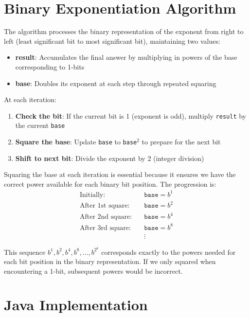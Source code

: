 \documentclass{article}
\begin{document}
	\section{Binary Exponentiation Algorithm}
	The algorithm processes the binary representation of the exponent from right to left (least significant bit to most significant bit), maintaining two values:
	\begin{itemize}[itemsep=2pt]
		\item \textbf{result}: Accumulates the final answer by multiplying in powers of the base corresponding to 1-bits
		\item \textbf{base}: Doubles its exponent at each step through repeated squaring
	\end{itemize}
	
	At each iteration:
	\begin{enumerate}[itemsep=2pt]
		\item \textbf{Check the bit}: If the current bit is 1 (exponent is odd), multiply \texttt{result} by the current \texttt{base}
		\item \textbf{Square the base}: Update \texttt{base} to \texttt{base}$^2$ to prepare for the next bit
		\item \textbf{Shift to next bit}: Divide the exponent by 2 (integer division)
	\end{enumerate}

	Squaring the base at each iteration is essential because it ensures we have the correct power available for each binary bit position. The progression is:
	\begin{align*}
		\text{Initially:} \quad & \texttt{base} = b^1 \\
		\text{After 1st square:} \quad & \texttt{base} = b^2 \\
		\text{After 2nd square:} \quad & \texttt{base} = b^4 \\
		\text{After 3rd square:} \quad & \texttt{base} = b^8 \\
		& \vdots
	\end{align*}
	
	This sequence $b^1, b^2, b^4, b^8, \ldots, b^{2^k}$ corresponds exactly to the powers needed for each bit position in the binary representation. If we only squared when encountering a 1-bit, subsequent powers would be incorrect.
	
	\section{Java Implementation}
	
\end{document}
